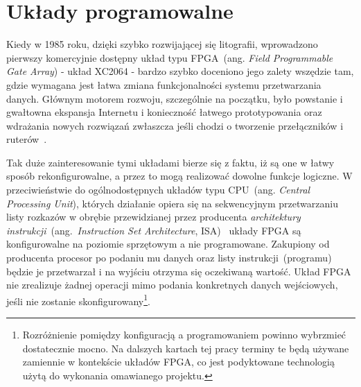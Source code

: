 \chapter{Układy programowalne}
Kiedy w 1985 roku, dzięki szybko rozwijającej się litografii, wprowadzono pierwszy komercyjnie dostępny układ typu FPGA~(ang. \textit{Field Programmable Gate Array}) - układ XC2064 - bardzo szybko doceniono jego zalety wszędzie tam, gdzie wymagana jest łatwa zmiana funkcjonalności systemu przetwarzania danych. Głównym motorem rozwoju, szczególnie na początku, było powstanie i gwałtowna ekspansja Internetu i konieczność łatwego prototypowania oraz wdrażania nowych rozwiązań zwłaszcza jeśli chodzi o tworzenie przełączników i ruterów~\cite{Designing_with_Xilinx}.

Tak duże zainteresowanie tymi układami bierze się z faktu, iż są one w łatwy sposób rekonfigurowalne, a przez to mogą realizować dowolne funkcje logiczne. W przeciwieństwie do ogólnodostępnych układów typu CPU~(ang. \textit{Central Processing Unit}), których działanie opiera się na sekwencyjnym przetwarzaniu listy rozkazów w obrębie przewidzianej przez producenta \textit{architektury instrukcji}~(ang.~\textit{Instruction Set Architecture}, ISA)~\cite{INTEL_ISA} układy FPGA są konfigurowalne na poziomie sprzętowym a nie programowane. Zakupiony od producenta procesor po podaniu mu danych oraz listy instrukcji~(programu) będzie je przetwarzał i na wyjściu otrzyma się oczekiwaną wartość. Układ FPGA nie zrealizuje żadnej operacji mimo podania konkretnych danych wejściowych, jeśli nie zostanie skonfigurowany\footnote{Rozróżnienie pomiędzy konfiguracją a programowaniem powinno wybrzmieć dostatecznie mocno. Na dalszych kartach tej pracy terminy te będą używane zamiennie w kontekście układów FPGA, co jest podyktowane technologią użytą do wykonania omawianego projektu.}.

